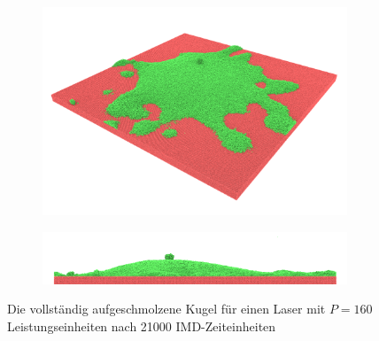 		\begin{figure}[!ht]
			\centering
			\begin{subfigure}{0.5\textwidth}
				\centering
				\includegraphics[width=\textwidth]{chapter/main/single/img/power_calibration/v10_p160_c420_perspective.png}
				\label{fig:vel10_p160_perspective}
			\end{subfigure}
			\begin{subfigure}{0.9\textwidth}
				\centering
				\includegraphics[width=\textwidth]{chapter/main/single/img/power_calibration/v10_p160_c420_side_cropped.png}
				\label{fig:vel10_p160_side}
			\end{subfigure}
			\caption{Die vollständig aufgeschmolzene Kugel für einen Laser mit
			$P = 160$ Leistungseinheiten nach 21000 IMD-Zeiteinheiten}
			\label{fig:vel10_p160}
		\end{figure}

